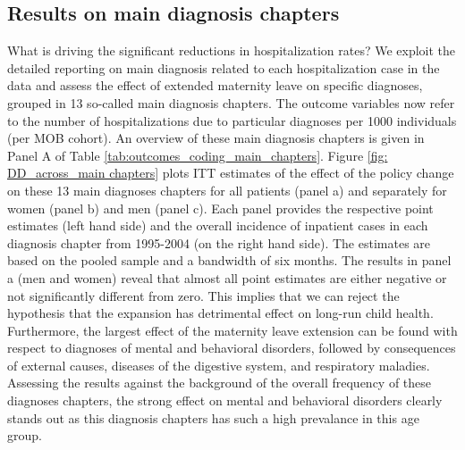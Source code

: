 \documentclass[11pt, a4paper]{article} %
\begin{document}
\bigskip




\subsection[The effect on main diagnosis chapters]{Results on main diagnosis chapters}

What is driving the significant reductions in hospitalization rates? We exploit the detailed reporting on main diagnosis related to each hospitalization case in the data and assess the effect of extended maternity leave on specific diagnoses, grouped in 13 so-called main diagnosis chapters. The outcome variables now refer to the number of hospitalizations due to particular diagnoses per 1000 individuals (per MOB cohort). An overview of these main diagnosis chapters is given in Panel A of Table \ref{tab:outcomes_coding_main_chapters}. \newline
Figure \ref{fig: DD_across_main chapters} plots ITT estimates of the effect of the policy change on these 13 main diagnoses chapters for all patients (panel a) and separately for women (panel b) and men (panel c). Each panel provides the respective point estimates (left hand side) and the overall incidence of inpatient cases in each diagnosis chapter from 1995-2004 (on the right hand side). The estimates are based on the pooled sample and a bandwidth of six months. The results in panel a (men and women) reveal that almost all point estimates are either negative or not significantly different from zero. This implies that we can reject the hypothesis that the expansion has detrimental effect on long-run child health. Furthermore, the largest effect of the maternity leave extension can be found with respect to diagnoses of mental and behavioral disorders, followed by consequences of external causes, diseases of the digestive system, and respiratory maladies. Assessing the results against the background of the overall frequency of these diagnoses chapters, the strong effect on mental and behavioral disorders clearly stands out as this diagnosis chapters has such a high prevalance in this age group.
\end{document}
